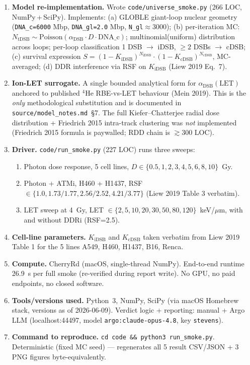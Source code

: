 \documentclass[11pt]{article}
\begin{document}
\begin{enumerate}
  \item \textbf{Model re-implementation.} Wrote \texttt{code/universe\_smoke.py} (266 LOC, NumPy\,+\,SciPy).
        Implements: (a) GLOBLE giant-loop nuclear geometry (\texttt{DNA\_c=6000} Mbp,
        \texttt{DNA\_gl=2.0} Mbp, \texttt{N\_gl}$\approx$3000); (b) per-iteration MC:
        $N_{\mathrm{tDSB}}\sim\mathrm{Poisson}(\alpha_{\mathrm{DSB}}\cdot D\cdot \mathrm{DNA\_c})$;
        multinomial(uniform) distribution across loops; per-loop classification 1 DSB $\to$ iDSB, $\geq 2$
        DSBs $\to$ cDSB; (c) survival expression
        $S=(1-K_{\mathrm{iDSB}})^{N_{\mathrm{iDSB}}}\cdot(1-K_{\mathrm{cDSB}})^{N_{\mathrm{cDSB}}}$,
        MC-averaged; (d) DDR interference via RSF on $K_{\mathrm{iDSB}}$ (Liew 2019 Eq.\ 7).
  \item \textbf{Ion-LET surrogate.} A single bounded analytical form for $\alpha_{\mathrm{DSB}}(\mathrm{LET})$
        anchored to published $^{4}$He RBE-vs-LET behaviour (Mein 2019). This is the \emph{only}
        methodological substitution and is documented in \texttt{source/model\_notes.md}~\S7.
        The full Kiefer--Chatterjee radial dose distribution + Friedrich 2015 intra-track clustering
        was \emph{not} implemented (Friedrich 2015 formula is paywalled; RDD chain is $\gtrsim$300 LOC).
  \item \textbf{Driver.} \texttt{code/run\_smoke.py} (227 LOC) runs three sweeps:
        \begin{enumerate}[nosep]
          \item Photon dose response, 5 cell lines, $D \in \{0.5,1,2,3,4,5,6,8,10\}$~Gy.
          \item Photon + ATMi, H460 + H1437, RSF $\in\{1.0, 1.73/1.77, 2.56/2.52, 4.21/3.77\}$
                (Liew 2019 Table 3 verbatim).
          \item LET sweep at 4~Gy, LET $\in \{2,5,10,20,30,50,80,120\}$~keV/$\mu$m, with and
                without DDRi (RSF=2.5).
        \end{enumerate}
  \item \textbf{Cell-line parameters.} $K_{\mathrm{iDSB}}$ and $K_{\mathrm{cDSB}}$ taken verbatim from
        Liew 2019 Table 1 for the 5 lines A549, H460, H1437, B16, Renca.
  \item \textbf{Compute.} CherryRd (macOS, single-thread NumPy). End-to-end runtime 26.9~s per full
        smoke (re-verified during report write). No GPU, no paid endpoints, no closed software.
  \item \textbf{Tools/versions used.} Python~3, NumPy, SciPy (via macOS Homebrew stack, versions as
        of 2026-06-09). Verdict logic + reporting: manual + Argo LLM (localhost:44497,
        model \texttt{argo:claude-opus-4.8}, key \texttt{stevens}).
  \item \textbf{Command to reproduce.} \texttt{cd code \&\& python3 run\_smoke.py}. Deterministic
        (fixed MC seed) --- regenerates all 5 result CSV/JSON + 3 PNG figures byte-equivalently.
\end{enumerate}
\end{document}
